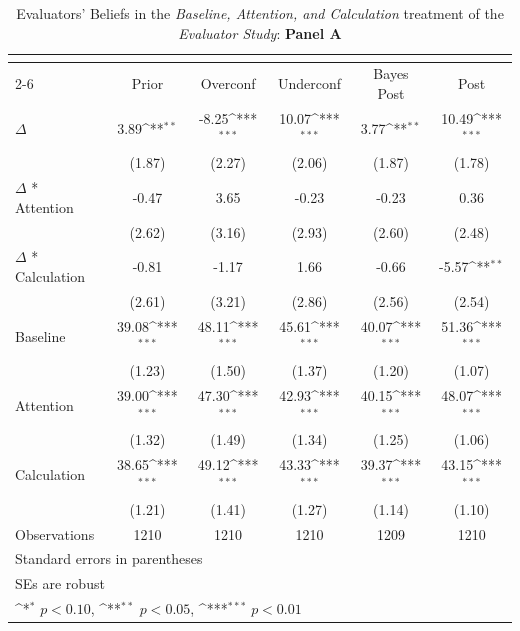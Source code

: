 \begin{table}[htbp]\centering
\def\sym#1{\ifmmode^{#1}\else\(^{#1}\)\fi}
\caption{Evaluators' Beliefs in the \textit{Baseline, Attention, and Calculation} treatment of the \textit{Evaluator Study}: \textbf{Panel A}}
\begin{tabular}{l*{5}{c}}
\hline\hline
                &\multicolumn{5}{c}{}                                                                          \\\cmidrule(lr){2-6}
                &\multicolumn{1}{c}{Prior}&\multicolumn{1}{c}{Overconf}&\multicolumn{1}{c}{Underconf}&\multicolumn{1}{c}{Bayes Post}&\multicolumn{1}{c}{Post}\\
\hline
$\Delta$        &     3.89\sym{**} &    -8.25\sym{***}&    10.07\sym{***}&     3.77\sym{**} &    10.49\sym{***}\\
                &   (1.87)         &   (2.27)         &   (2.06)         &   (1.87)         &   (1.78)         \\
$\Delta$ * Attention&    -0.47         &     3.65         &    -0.23         &    -0.23         &     0.36         \\
                &   (2.62)         &   (3.16)         &   (2.93)         &   (2.60)         &   (2.48)         \\
$\Delta$ * Calculation&    -0.81         &    -1.17         &     1.66         &    -0.66         &    -5.57\sym{**} \\
                &   (2.61)         &   (3.21)         &   (2.86)         &   (2.56)         &   (2.54)         \\
Baseline        &    39.08\sym{***}&    48.11\sym{***}&    45.61\sym{***}&    40.07\sym{***}&    51.36\sym{***}\\
                &   (1.23)         &   (1.50)         &   (1.37)         &   (1.20)         &   (1.07)         \\
Attention       &    39.00\sym{***}&    47.30\sym{***}&    42.93\sym{***}&    40.15\sym{***}&    48.07\sym{***}\\
                &   (1.32)         &   (1.49)         &   (1.34)         &   (1.25)         &   (1.06)         \\
Calculation     &    38.65\sym{***}&    49.12\sym{***}&    43.33\sym{***}&    39.37\sym{***}&    43.15\sym{***}\\
                &   (1.21)         &   (1.41)         &   (1.27)         &   (1.14)         &   (1.10)         \\
\hline
Observations    &     1210         &     1210         &     1210         &     1209         &     1210         \\
\hline\hline
\multicolumn{6}{l}{\footnotesize Standard errors in parentheses}\\
\multicolumn{6}{l}{\footnotesize SEs are robust}\\
\multicolumn{6}{l}{\footnotesize \sym{*} \(p<0.10\), \sym{**} \(p<0.05\), \sym{***} \(p<0.01\)}\\
\end{tabular}
\end{table}
